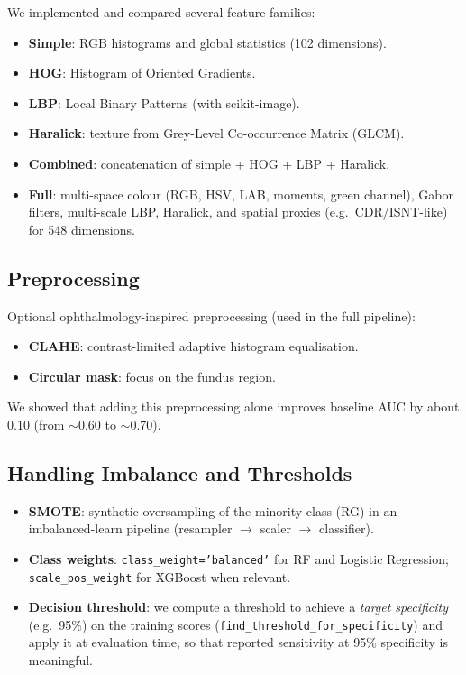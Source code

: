 \documentclass[11pt,a4paper]{article}
\begin{document}
We implemented and compared several feature families:
\begin{itemize}
  \item \textbf{Simple}: RGB histograms and global statistics (102 dimensions).
  \item \textbf{HOG}: Histogram of Oriented Gradients.
  \item \textbf{LBP}: Local Binary Patterns (with scikit-image).
  \item \textbf{Haralick}: texture from Grey-Level Co-occurrence Matrix (GLCM).
  \item \textbf{Combined}: concatenation of simple + HOG + LBP + Haralick.
  \item \textbf{Full}: multi-space colour (RGB, HSV, LAB, moments, green channel), Gabor filters, multi-scale LBP, Haralick, and spatial proxies (e.g.\ CDR/ISNT-like) for 548 dimensions.
\end{itemize}

\subsection{Preprocessing}

Optional ophthalmology-inspired preprocessing (used in the full pipeline):
\begin{itemize}
  \item \textbf{CLAHE}: contrast-limited adaptive histogram equalisation.
  \item \textbf{Circular mask}: focus on the fundus region.
\end{itemize}

We showed that adding this preprocessing alone improves baseline AUC by about 0.10 (from $\sim$0.60 to $\sim$0.70).

\subsection{Handling Imbalance and Thresholds}

\begin{itemize}
  \item \textbf{SMOTE}: synthetic oversampling of the minority class (RG) in an imbalanced-learn pipeline (resampler $\to$ scaler $\to$ classifier).
  \item \textbf{Class weights}: \texttt{class\_weight='balanced'} for RF and Logistic Regression; \texttt{scale\_pos\_weight} for XGBoost when relevant.
  \item \textbf{Decision threshold}: we compute a threshold to achieve a \emph{target specificity} (e.g.\ 95\%) on the training scores (\texttt{find\_threshold\_for\_specificity}) and apply it at evaluation time, so that reported sensitivity at 95\% specificity is meaningful.
\end{itemize}
\end{document}
